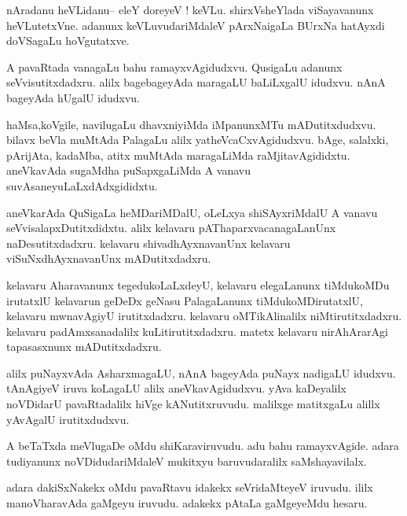\documentclass{article}
\begin{document}
\begin{mn}%
nAradanu heVLidanu-- eleY doreyeV ! keVLu. shirxVsheYlada viSayavanunx heVLutetxVne. adanunx 
keVLuvudariMdaleV pArxNaigaLa BUrxNa hatAyxdi doVSagaLu hoVgutatxve.
\end{mn}

\begin{mn}%
A pavaRtada vanagaLu bahu ramayxvAgidudxvu. QusigaLu adanunx seVvisutitxdadxru. alilx 
bagebageyAda maragaLU baLiLxgalU idudxvu. nAnA bageyAda hUgalU idudxvu.
\end{mn}

\begin{mn}%
haMsa,koVgile, navilugaLu dhavxniyiMda iMpanunxMTu mADutitxdudxvu. bilavx beVla muMtAda 
PalagaLu alilx yatheVcaCxvAgidudxvu. bAge, salalxki, pArijAta, kadaMba, atitx muMtAda 
maragaLiMda raMjitavAgididxtu. aneVkavAda sugaMdha puSapxgaLiMda A vanavu 
suvAsaneyuLaLxdAdxgididxtu.
\end{mn}

\begin{mn}%
aneVkarAda QuSigaLa heMDariMDalU, oLeLxya shiSAyxriMdalU A vanavu seVvisalapxDutitxdidxtu. 
alilx kelavaru pAThaparxvacanagaLanUnx naDesutitxdadxru. kelavaru shivadhAyxnavanUnx 
kelavaru viSuNxdhAyxnavanUnx mADutitxdadxru.
\end{mn}

\begin{mn}%
kelavaru Aharavanunx tegedukoLaLxdeyU, kelavaru elegaLanunx tiMdukoMDu irutatxlU kelavarun 
geDeDx geNasu PalagaLanunx tiMdukoMDirutatxlU, kelavaru mwnavAgiyU irutitxdadxru. kelavaru 
oMTikAlinalilx niMtirutitxdadxru. kelavaru padAmxsanadalilx kuLitirutitxdadxru. matetx 
kelavaru nirAhArarAgi tapasasxnunx mADutitxdadxru.
\end{mn}

\begin{mn}%
alilx puNayxvAda AsharxmagaLU, nAnA bageyAda puNayx nadigaLU idudxvu. tAnAgiyeV iruva 
koLagaLU alilx aneVkavAgidudxvu. yAva kaDeyalilx noVDidarU pavaRtadalilx hiVge 
kANutitxruvudu. malilxge matitxgaLu alillx yAvAgalU irutitxdudxvu.
\end{mn}

\begin{mn}%
A beTaTxda meVlugaDe oMdu shiKaraviruvudu. adu bahu ramayxvAgide. adara tudiyanunx 
noVDidudariMdaleV mukitxyu baruvudaralilx saMshayavilalx.
\end{mn}

\begin{mn}%
adara dakiSxNakekx oMdu pavaRtavu idakekx seVridaMteyeV iruvudu. ililx manoVharavAda gaMgeyu 
iruvudu. adakekx pAtaLa gaMgeyeMdu hesaru.
\end{mn}
\end{document}
